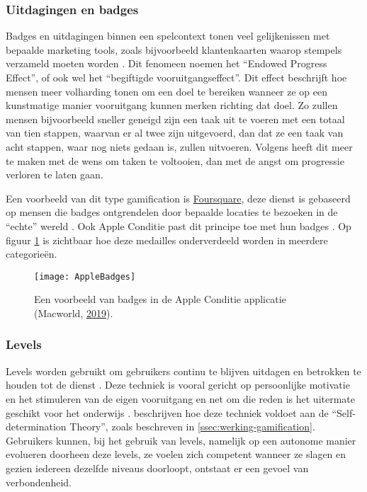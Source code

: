 \subsubsection{Uitdagingen en badges}
Badges en uitdagingen binnen een spelcontext tonen veel gelijkenissen met bepaalde marketing tools, zoals bijvoorbeeld klantenkaarten waarop stempels verzameld moeten worden \autocite{Nunes2006}. Dit fenomeen noemen \textcite{Nunes2006} het ``Endowed Progress Effect'', of ook wel het ``begiftigde vooruitgangseffect''. Dit effect beschrijft hoe mensen meer volharding tonen om een doel te bereiken wanneer ze op een kunstmatige manier vooruitgang kunnen merken richting dat doel. Zo zullen mensen bijvoorbeeld sneller geneigd zijn een taak uit te voeren met een totaal van tien stappen, waarvan er al twee zijn uitgevoerd, dan dat ze een taak van acht stappen, waar nog niets gedaan is, zullen uitvoeren. Volgens \textcite{Nunes2006} heeft dit meer te maken met de wens om taken te voltooien, dan met de angst om progressie verloren te laten gaan.

Een voorbeeld van dit type gamification is \href{https://foursquare.com/}{Foursquare}, deze dienst is gebaseerd op mensen die badges ontgrendelen door bepaalde locaties te bezoeken in de ``echte'' wereld \autocite{Hamari2011}. Ook Apple Conditie past dit principe toe met hun badges \autocite{Ha2020}. Op figuur \ref{fig:apple_badges} is zichtbaar hoe deze medailles onderverdeeld worden in meerdere categorieën.

\begin{figure}[h]
    \caption[Badges in de Apple Conditie applicatie]{Een voorbeeld van badges in de Apple Conditie applicatie (Macworld, \href{https://www.macworld.com/article/231140/how-to-get-all-of-the-apple-watch-activity-challenge-badges.html}{2019}).}
    \texttt{[image: AppleBadges]}
    \label{fig:apple_badges}
\end{figure}

\subsubsection{Levels}
\label{sssec:levels}
Levels worden gebruikt om gebruikers continu te blijven uitdagen en betrokken te houden tot de dienst \autocite{Dong2012}. Deze techniek is vooral gericht op persoonlijke motivatie en het stimuleren van de eigen vooruitgang en net om die reden is het uitermate geschikt voor het onderwijs \autocite{ManzanoLeon2021}.
\textcite{ManzanoLeon2021} beschrijven hoe deze techniek voldoet aan de ``Self-determination Theory'', zoals beschreven in \ref{ssec:werking-gamification}. Gebruikers kunnen, bij het gebruik van levels, namelijk op een autonome manier evolueren doorheen deze levels, ze voelen zich competent wanneer ze slagen en gezien iedereen dezelfde niveaus doorloopt, ontstaat er een gevoel van verbondenheid.

